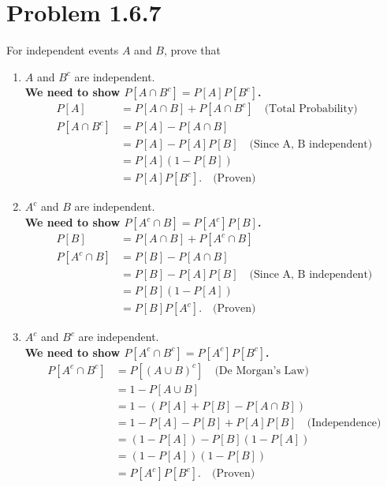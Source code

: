 \documentclass{article}
\begin{document}
\section*{Problem 1.6.7}
For independent events $A$ and $B$, prove that
\begin{enumerate}[label=(\alph*)]
    \item $A$ and $B^c$ are independent. \\[1em]
    {\boldmath\textbf{We need to show $P[A \cap B^c] = P[A]P[B^c]$.
    \begin{align*}
        P[A] &= P[A \cap B] + P[A \cap B^c] \quad \text{(Total Probability)} \\
        P[A \cap B^c] &= P[A] - P[A \cap B] \\
        &= P[A] - P[A]P[B] \quad \text{(Since A, B independent)} \\
        &= P[A](1 - P[B]) \\
        &= P[A]P[B^c]. \quad \text{(Proven)}
    \end{align*}
    }}

    \item $A^c$ and $B$ are independent. \\[1em]
    {\boldmath\textbf{We need to show $P[A^c \cap B] = P[A^c]P[B]$.
    \begin{align*}
        P[B] &= P[A \cap B] + P[A^c \cap B] \\
        P[A^c \cap B] &= P[B] - P[A \cap B] \\
        &= P[B] - P[A]P[B] \quad \text{(Since A, B independent)} \\
        &= P[B](1 - P[A]) \\
        &= P[B]P[A^c]. \quad \text{(Proven)}
    \end{align*}
    }}

    \item $A^c$ and $B^c$ are independent. \\[1em]
    {\boldmath\textbf{We need to show $P[A^c \cap B^c] = P[A^c]P[B^c]$.
    \begin{align*}
        P[A^c \cap B^c] &= P[(A \cup B)^c] \quad \text{(De Morgan's Law)} \\
        &= 1 - P[A \cup B] \\
        &= 1 - (P[A] + P[B] - P[A \cap B]) \\
        &= 1 - P[A] - P[B] + P[A]P[B] \quad \text{(Independence)} \\
        &= (1 - P[A]) - P[B](1 - P[A]) \\
        &= (1 - P[A])(1 - P[B]) \\
        &= P[A^c]P[B^c]. \quad \text{(Proven)}
    \end{align*}
    }}
\end{enumerate}
\end{document}
